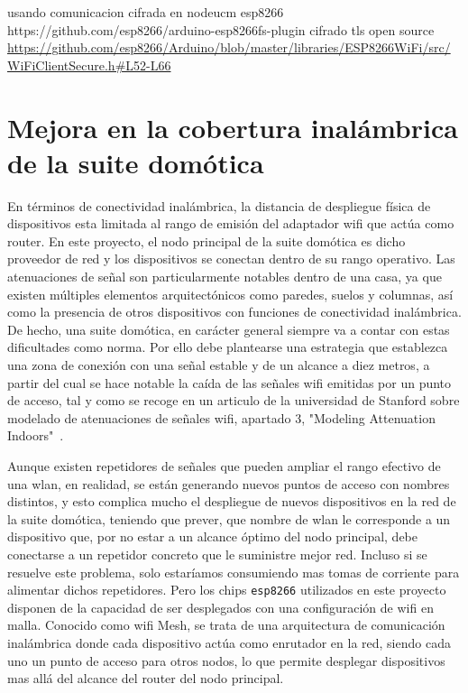 usando comunicacion cifrada en nodeucm esp8266
https://github.com/esp8266/arduino-esp8266fs-plugin
cifrado tls open source
\url{https://github.com/esp8266/Arduino/blob/master/libraries/ESP8266WiFi/src/WiFiClientSecure.h#L52-L66}

\section{Mejora en la cobertura inalámbrica de la suite domótica}
\label{ch:Capitulo6.2}

En términos de conectividad inalámbrica, la distancia de despliegue física de dispositivos esta limitada al rango de emisión del adaptador \gls{wifi} que actúa como router. En este proyecto, el nodo principal de la suite domótica es dicho proveedor de red y los dispositivos se conectan dentro de su rango operativo. Las atenuaciones de señal son particularmente notables dentro de una casa, ya que existen múltiples elementos arquitectónicos como paredes, suelos y columnas, así como la presencia de otros dispositivos con funciones de conectividad inalámbrica. De hecho, una suite domótica, en carácter general siempre va a contar con estas dificultades como norma. Por ello debe plantearse una estrategia que establezca una zona de conexión con una señal estable y de un alcance a diez metros, a partir del cual se hace notable la caída de las señales \gls{wifi} emitidas por un punto de acceso, tal y como se recoge en un articulo de la universidad de Stanford sobre modelado de atenuaciones de señales \gls{wifi}, apartado 3, "Modeling Attenuation Indoors"~\cite{faria2005modeling}.

\vspace{1cm}

Aunque existen repetidores de señales que pueden ampliar el rango efectivo de una \gls{wlan}, en realidad, se están generando nuevos puntos de acceso con nombres distintos, y esto complica mucho el despliegue de nuevos dispositivos en la red de la suite domótica, teniendo que prever, que nombre de \gls{wlan} le corresponde a un dispositivo que, por no estar a un alcance óptimo del nodo principal, debe conectarse a un repetidor concreto que le suministre mejor red. Incluso si se resuelve este problema, solo estaríamos consumiendo mas tomas de corriente para alimentar dichos repetidores. Pero los chips \verb|esp8266| utilizados en este proyecto disponen de la capacidad de ser desplegados con una configuración de \gls{wifi} en malla. Conocido como \gls{wifi} Mesh, se trata de una arquitectura de comunicación inalámbrica donde cada dispositivo actúa como enrutador en la red, siendo cada uno un punto de acceso para otros nodos, lo que permite desplegar dispositivos mas allá del alcance del router del nodo principal.

